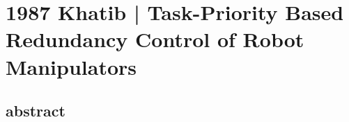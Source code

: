 \section{1987 Khatib | Task-Priority Based Redundancy Control of Robot Manipulators}

\cite{khatib1987} 

\subsection{abstract}


